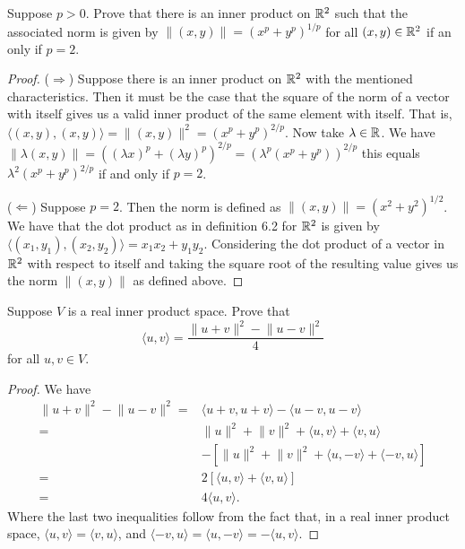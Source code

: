 \begin{exercise}{18}
  Suppose $p>0$. Prove that there is an inner product on $\mathbb{R}^2$ such that the associated norm is given by $\lVert (x,y)\rVert =(x^p+y^p)^{1/p}$ for all $(x,y)\in\mathbb{R}^2$ if an only if $p=2$.
\end{exercise}
\begin{proof}
 ($\Rightarrow$) Suppose there is an inner product on $\mathbb{R}^2$ with the mentioned characteristics. Then it must be the case that the square  of the norm of a vector with itself gives us a valid inner product of the same element with itself. That is, $\langle (x,y), (x,y)\rangle=\lVert (x,y)\rVert^2= (x^p+y^p)^{2/p}$. Now take $\lambda\in\mathbb{R}$. We have $\lVert\lambda(x,y)\rVert= ((\lambda x)^p+(\lambda y)^p)^{2/p}=(\lambda^p(x^p+y^p))^{2/p}$ this equals $\lambda^2(x^p+y^p)^{2/p}$ if and only if $p=2$.

 ($\Leftarrow$) Suppose $p=2$. Then the norm is defined as $\lVert (x,y)\rVert =(x^2+y^2)^{1/2}$. We have that the dot product as in definition 6.2 for $\mathbb{R}^2$ is given by $\langle (x_1,y_1), (x_2,y_2)\rangle= x_1x_2+y_1y_2$. Considering the dot product of a vector in $\mathbb{R}^2$ with respect to itself and taking the square root of the resulting value gives us the norm $\lVert (x,y)\rVert$ as defined above.
\end{proof}

\begin{exercise}{19}
  Suppose $V$ is a real inner product space. Prove that 
  \[
  \langle u,v\rangle=\frac{\lVert u+v\rVert^2-\lVert u-v\rVert^2}{4}
  \]
  for all $u,v\in V$.
\end{exercise}
\begin{proof}
 We have
 \begin{align*}
     \lVert u+v\rVert^2-\lVert u-v\rVert^2 =& \langle u+v,u+v\rangle - \langle u-v,u-v\rangle\\
     =&\lVert u\rVert^2+\lVert v\rVert^2+\langle u,v\rangle +\langle v,u\rangle\\
     &-[\lVert u\rVert^2+\lVert v\rVert^2+\langle u,-v\rangle+\langle -v,u\rangle]\\
     =& 2[\langle u,v\rangle+\langle v, u\rangle]\\
     =& 4\langle u,v\rangle.
 \end{align*}
Where the last two inequalities follow from the fact that, in a real inner product space, $\langle u,v\rangle=\langle v,u\rangle$, and $\langle -v,u\rangle=\langle u,-v\rangle=-\langle u,v\rangle$.
\end{proof}

